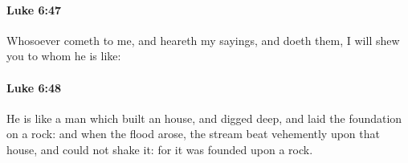 		\paragraph{Luke 6:47} %
			\label{LUKE-6-47}

			Whosoever cometh to me, and heareth my sayings, and doeth them, I will shew you to whom he is like:

			\begin{framed}
			\scriptsize
				\begin{compactdesc}
					\item[SBLG] 
				\end{compactdesc}
			\end{framed}

		\paragraph{Luke 6:48} %
			\label{LUKE-6-48}

			He is like a man which built an house, and digged deep, and laid the foundation on a rock: and when the flood arose, the stream beat vehemently upon that house, and could not shake it: for it was founded upon a rock.

